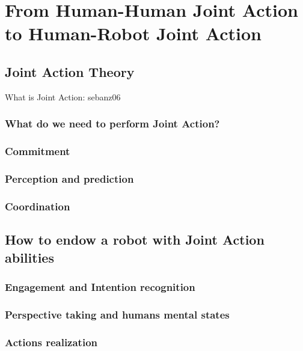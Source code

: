 \documentclass[english,a4paper,11pt,twoside]{StyleThese}
\begin{document}
\setcounter{chapter}{0} %
\dominitoc
\faketableofcontents
\fi

\chapter{From Human-Human Joint Action to Human-Robot Joint Action}
\minitoc

\section{Joint Action Theory}

What is Joint Action: sebanz06

\subsection{What do we need to perform Joint Action?}

\subsection{Commitment}

\subsection{Perception and prediction}

\subsection{Coordination}



\section{How to endow a robot with Joint Action abilities}

\subsection{Engagement and Intention recognition}

\subsection{Perspective taking and humans mental states}

\subsection{Actions realization}
\end{document}
